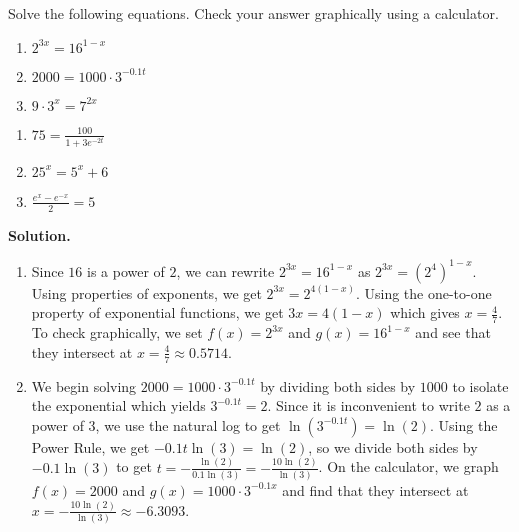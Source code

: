 \begin{ex}  \label{expeqnsex1} Solve the following equations.  Check your answer graphically using a calculator.

\begin{multicols}{3}
\begin{enumerate}

\item  $2^{3x} = 16^{1-x}$

\item  $2000 = 1000 \cdot 3^{-0.1 t}$ 

\item  $9 \cdot 3^{x} = 7^{2x}$

\setcounter{HW}{\value{enumi}}
\end{enumerate}
\end{multicols}

\begin{multicols}{3}
\begin{enumerate}
\setcounter{enumi}{\value{HW}}

\item  $75 = \frac{100}{1 + 3e^{-2t}}$

\item  $25^{x} = 5^{x} + 6$

\item  $\frac{e^{x} - e^{-x}}{2} = 5$

\end{enumerate}
\end{multicols}

{\bf Solution.}

\begin{enumerate}

\item  Since $16$ is a power of $2$, we can rewrite  $2^{3x} =  16^{1-x}$ as $2^{3x} = \left(2^4\right)^{1-x}$.  Using properties of exponents, we get $2^{3x} = 2^{4(1-x)}$.  Using the one-to-one property of exponential functions, we get $3x = 4(1-x)$ which gives $x=\frac{4}{7}$. To check graphically, we set $f(x) = 2^{3x}$ and $g(x) = 16^{1-x}$ and see that they intersect at $x=\frac{4}{7} \approx 0.5714$.

\item  We begin solving $2000 = 1000 \cdot 3^{-0.1 t}$  by dividing both sides by $1000$ to isolate the exponential which yields $3^{-0.1t} = 2$.  Since it is inconvenient to write $2$ as a power of $3$, we use the natural log to get $\ln\left(3^{-0.1t}\right) = \ln(2)$.  Using the Power Rule, we get $-0.1 t \ln(3) = \ln(2)$, so we divide both sides by $-0.1 \ln(3)$ to get $t = -\frac{\ln(2)}{0.1 \ln(3)} = -\frac{10\ln(2)}{\ln(3)}$.  On the calculator, we graph $f(x) = 2000$ and $g(x) =  1000 \cdot 3^{-0.1 x}$ and find that they intersect at $x = -\frac{10\ln(2)}{\ln(3)} \approx -6.3093$.


\end{enumerate}
\end{ex}
